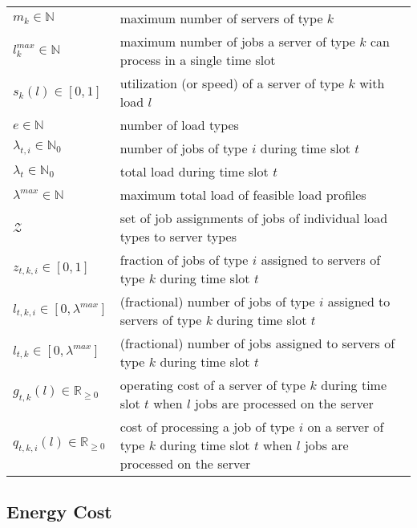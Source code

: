\begin{tabularx}{\textwidth}{lX}
    $m_k \in \mathbb{N}$ & maximum number of servers of type $k$ \\
    $l_k^{max} \in \mathbb{N}$ & maximum number of jobs a server of type $k$ can process in a single time slot \\
    $s_k(l) \in [0,1]$ & utilization (or speed) of a server of type $k$ with load $l$ \\
    $e \in \mathbb{N}$ & number of load types \\
    $\lambda_{t,i} \in \mathbb{N}_0$ & number of jobs of type $i$ during time slot $t$ \\
    $\lambda_t \in \mathbb{N}_0$ & total load during time slot $t$ \\
    $\lambda^{max} \in \mathbb{N}$ & maximum total load of feasible load profiles \\
    $\mathcal{Z}$ & set of job assignments of jobs of individual load types to server types \\
    $z_{t,k,i} \in [0,1]$ & fraction of jobs of type $i$ assigned to servers of type $k$ during time slot $t$ \\
    $l_{t,k,i} \in [0,\lambda^{max}]$ & (fractional) number of jobs of type $i$ assigned to servers of type $k$ during time slot $t$ \\
    $l_{t,k} \in [0,\lambda^{max}]$ & (fractional) number of jobs assigned to servers of type $k$ during time slot $t$ \\
    $g_{t,k}(l) \in \mathbb{R}_{\geq 0}$ & operating cost of a server of type $k$ during time slot $t$ when $l$ jobs are processed on the server \\
    $q_{t,k,i}(l) \in \mathbb{R}_{\geq 0}$ & cost of processing a job of type $i$ on a server of type $k$ during time slot $t$ when $l$ jobs are processed on the server \\
\end{tabularx}

\vspace{\fill}

\subsection*{Energy Cost}

